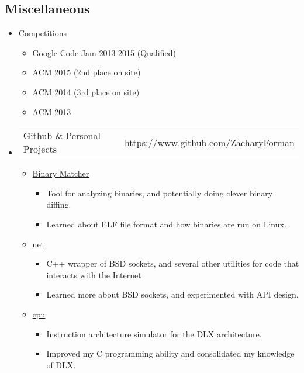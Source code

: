 \documentclass[10pt,letterpaper]{article}
\makeatletter
\newcommand{\headerrow}[2]
{\begin{tabular*}{\linewidth}{l@{\extracolsep{\fill}}r}
  #1 &
  #2 \\
\end{tabular*}}
\makeatother
\begin{document}
\subsection*{Miscellaneous}
\begin{itemize}
  \item Competitions
    \begin{itemize}
      \item Google Code Jam 2013-2015 (Qualified)
      \item ACM 2015 (2nd place on site)
      \item ACM 2014 (3rd place on site)
      \item ACM 2013
    \end{itemize}
  \item
  \headerrow
    {Github \& Personal Projects}
    {\url{https://www.github.com/ZacharyForman}}
    \begin{itemize}
      \item \href{https://github.com/ZacharyForman/Binary_Matcher}{Binary Matcher}
        \begin{itemize}
          \item Tool for analyzing binaries, and potentially doing clever
                binary diffing.
          \item Learned about ELF file format and how binaries are run on Linux.
        \end{itemize}
      \item \href{https://github.com/ZacharyForman/net}{net}
        \begin{itemize}
          \item C++ wrapper of BSD sockets, and several other utilities for
                code that interacts with the Internet
          \item Learned more about BSD sockets, and experimented with API
                design.
        \end{itemize}
      \item \href{https://github.com/ZacharyForman/cpu}{cpu}
        \begin{itemize}
          \item Instruction architecture simulator for the DLX architecture.
          \item Improved my C programming ability and consolidated my knowledge
                of DLX.
        \end{itemize}
    \end{itemize}
\end{itemize}
\end{document}
